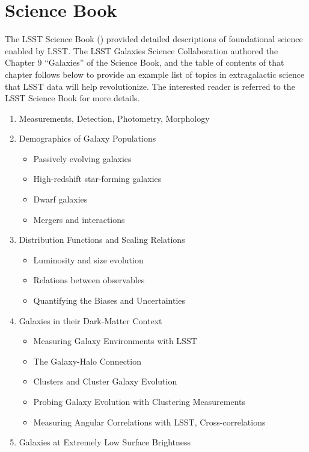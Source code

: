 {\vspace{-0.05in}
\section{Science Book}
\label{sec:sci:gal:bkgnd:scibook}

The LSST Science Book (\citealt{LSSTSciBook}) provided 
detailed descriptions of foundational science enabled
by LSST. The LSST Galaxies Science Collaboration authored
the Chapter 9 ``Galaxies'' of the Science Book, and the
table of contents of that chapter follows below to 
provide an example list of topics in extragalactic
science that LSST data will help revolutionize. The
interested reader is referred to the LSST Science 
Book for more details.


\begin{enumerate}
\item Measurements, Detection, Photometry, Morphology
\item Demographics of Galaxy Populations
\begin{itemize}
\item Passively evolving galaxies
\item High-redshift star-forming galaxies
\item Dwarf galaxies
\item Mergers and interactions
\end{itemize}
\item Distribution Functions and Scaling Relations
\begin{itemize}
\item Luminosity and size evolution
\item Relations between observables
\item Quantifying the Biases and Uncertainties
\end{itemize}
\item Galaxies in their Dark-Matter Context
\begin{itemize}
\item Measuring Galaxy Environments with LSST
\item The Galaxy-Halo Connection
\item Clusters and Cluster Galaxy Evolution
\item Probing Galaxy Evolution with Clustering Measurements
\item Measuring Angular Correlations with LSST, Cross-correlations
\end{itemize}
\item Galaxies at Extremely Low Surface Brightness

\end{enumerate}}
